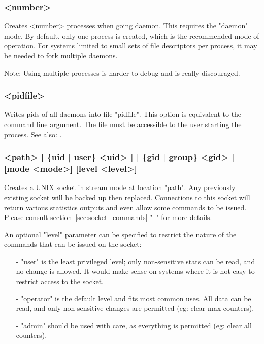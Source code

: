 \subsubsection[nbproc]{ <number>}

Creates <number> processes when going daemon. This requires the "daemon"
mode. By default, only one process is created, which is the recommended mode
of operation. For systems limited to small sets of file descriptors per
process, it may be needed to fork multiple daemons.

\begin{note}{Note:}
Using multiple processes
is harder to debug and is really discouraged.
\end{note}


\subsubsection[pidfile]{ <pidfile>}

  Writes pids of all daemons into file "pidfile". This option is equivalent to
  the  command line argument. The file must be accessible to the user
  starting the process.
See also: .

\subsubsection[stats socket]{ <path> [ \{uid | user\} <uid> ] [ \{gid | group\} <gid> ] [mode <mode>] [level <level>]}

Creates a UNIX socket in stream mode at location "path". Any previously
existing socket will be backed up then replaced. Connections to this socket
will return various statistics outputs and even allow some commands to be
issued. Please consult section~\ref{sec:socket_commands}
"~" for more details.

An optional "level" parameter can be specified to restrict the nature of
the commands that can be issued on the socket:

\begin{itemize}
\item[-] "user" is the least privileged level; only non-sensitive stats can be
  read, and no change is allowed. It would make sense on systems where it
  is not easy to restrict access to the socket.

\item[-] "operator" is the default level and fits most common uses. All data can
  be read, and only non-sensitive changes are permitted (eg: clear max
  counters).

\item[-] "admin" should be used with care, as everything is permitted (eg: clear
  all counters).
\end{itemize}
  
